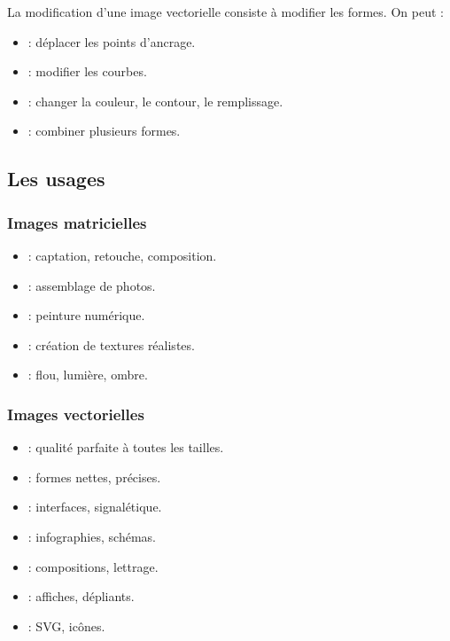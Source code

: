 La modification d'une image vectorielle consiste à modifier les formes. On peut :

\begin{itemize}
    \item {} : déplacer les points d'ancrage.
    \item {} : modifier les courbes.
    \item {} : changer la couleur, le contour, le remplissage.
    \item {} : combiner plusieurs formes.
\end{itemize}

\subsection{Les usages}

\subsubsection{Images matricielles}

\begin{itemize}
    \item {} : captation, retouche, composition.
    \item {} : assemblage de photos.
    \item {} : peinture numérique.
    \item {} : création de textures réalistes.
    \item {} : flou, lumière, ombre.
\end{itemize}

\subsubsection{Images vectorielles}

\begin{itemize}
    \item {} : qualité parfaite à toutes les tailles.
    \item {} : formes nettes, précises.
    \item {} : interfaces, signalétique.
    \item {} : infographies, schémas.
    \item {} : compositions, lettrage.
    \item {} : affiches, dépliants.
    \item {} : SVG, icônes.
\end{itemize}

